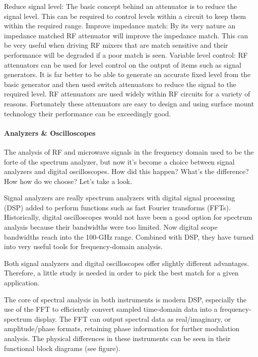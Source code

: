 Reduce signal level:   The basic concept behind an attenuator is to reduce the signal level. This can be required to control levels within a circuit to keep them within the required range.
Improve impedance match:   By its very nature an impedance matched RF attenuator will improve the impedance match. This can be very useful when driving RF mixers that are match sensitive and their performance will be degraded if a poor match is seen.
Variable level control:   RF attenuators can be used for level control on the output of items such as signal generators. It is far better to be able to generate an accurate fixed level from the basic generator and then used switch attenuators to reduce the signal to the required level.
RF attenuators are used widely within RF circuits for a variety of reasons. Fortunately these attenuators are easy to design and using surface mount technology their performance can be exceedingly good.

\paragraph{Analyzers \& Oscilloscopes}

	The analysis of RF and microwave signals in the frequency domain used to be the forte of the spectrum analyzer, but now it’s become a choice between signal analyzers and digital oscilloscopes. How did this happen? What’s the difference? How how do we choose? Let’s take a look.

Signal analyzers are really spectrum analyzers with digital signal processing (DSP) added to perform functions such as fast Fourier transforms (FFTs). Historically, digital oscilloscopes would not have been a good option for spectrum analysis because their bandwidths were too limited. Now digital scope bandwidths reach into the 100-GHz range. Combined with DSP, they have turned into very useful tools for frequency-domain analysis.

Both signal analyzers and digital oscilloscopes offer slightly different advantages. Therefore, a little study is needed in order to pick the best match for a given application.

The core of spectral analysis in both instruments is modern DSP, especially the use of the FFT to efficiently convert sampled time-domain data into a frequency-spectrum display. The FFT can output spectral data as real/imaginary, or amplitude/phase formats, retaining phase information for further modulation analysis. The physical differences in these instruments can be seen in their functional block diagrams (see figure).


